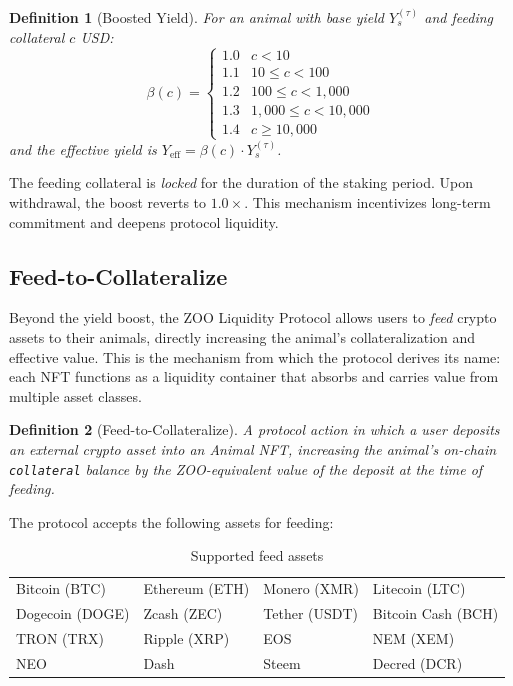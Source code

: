 \documentclass[11pt,letterpaper]{article}
\newtheorem{definition}{Definition}[section]
\begin{document}
\begin{definition}[Boosted Yield]
For an animal with base yield $Y_s^{(\tau)}$ and feeding collateral $c$ USD:
\begin{equation}
\beta(c) =
\begin{cases}
1.0 & c < 10 \\
1.1 & 10 \leq c < 100 \\
1.2 & 100 \leq c < 1{,}000 \\
1.3 & 1{,}000 \leq c < 10{,}000 \\
1.4 & c \geq 10{,}000
\end{cases}
\label{eq:boost-function}
\end{equation}
and the effective yield is $Y_{\text{eff}} = \beta(c) \cdot Y_s^{(\tau)}$.
\end{definition}

The feeding collateral is \emph{locked} for the duration of the staking period.  Upon withdrawal, the boost reverts to $1.0\times$.  This mechanism incentivizes long-term commitment and deepens protocol liquidity.

\subsection{Feed-to-Collateralize}

Beyond the yield boost, the ZOO Liquidity Protocol allows users to
\emph{feed} crypto assets to their animals, directly increasing the animal's
collateralization and effective value.  This is the mechanism from which the protocol
derives its name: each NFT functions as a liquidity container that absorbs and carries
value from multiple asset classes.

\begin{definition}[Feed-to-Collateralize]
A protocol action in which a user deposits an external crypto asset into an Animal NFT,
increasing the animal's on-chain \texttt{collateral} balance by the ZOO-equivalent value
of the deposit at the time of feeding.
\end{definition}

The protocol accepts the following assets for feeding:

\begin{table}[ht]
\centering
\caption{Supported feed assets}
\label{tab:feed_assets}
\begin{tabular}{llll}
\toprule
Bitcoin (BTC) & Ethereum (ETH) & Monero (XMR) & Litecoin (LTC) \\
Dogecoin (DOGE) & Zcash (ZEC) & Tether (USDT) & Bitcoin Cash (BCH) \\
TRON (TRX) & Ripple (XRP) & EOS & NEM (XEM) \\
NEO & Dash & Steem & Decred (DCR) \\
\bottomrule
\end{tabular}
\end{table}
\end{document}
